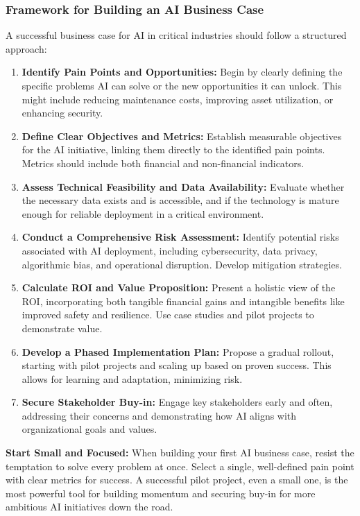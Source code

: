 \subsubsection{Framework for Building an AI Business Case}
A successful business case for AI in critical industries should follow a structured approach:
\begin{enumerate}
    \item \textbf{Identify Pain Points and Opportunities:} Begin by clearly defining the specific problems AI can solve or the new opportunities it can unlock. This might include reducing maintenance costs, improving asset utilization, or enhancing security.
    \item \textbf{Define Clear Objectives and Metrics:} Establish measurable objectives for the AI initiative, linking them directly to the identified pain points. Metrics should include both financial and non-financial indicators.
    \item \textbf{Assess Technical Feasibility and Data Availability:} Evaluate whether the necessary data exists and is accessible, and if the technology is mature enough for reliable deployment in a critical environment.
    \item \textbf{Conduct a Comprehensive Risk Assessment:} Identify potential risks associated with AI deployment, including cybersecurity, data privacy, algorithmic bias, and operational disruption. Develop mitigation strategies.
    \item \textbf{Calculate ROI and Value Proposition:} Present a holistic view of the ROI, incorporating both tangible financial gains and intangible benefits like improved safety and resilience. Use case studies and pilot projects to demonstrate value.
    \item \textbf{Develop a Phased Implementation Plan:} Propose a gradual rollout, starting with pilot projects and scaling up based on proven success. This allows for learning and adaptation, minimizing risk.
    \item \textbf{Secure Stakeholder Buy-in:} Engage key stakeholders early and often, addressing their concerns and demonstrating how AI aligns with organizational goals and values.
\end{enumerate}

\begin{tip}
\textbf{Start Small and Focused:} When building your first AI business case, resist the temptation to solve every problem at once. Select a single, well-defined pain point with clear metrics for success. A successful pilot project, even a small one, is the most powerful tool for building momentum and securing buy-in for more ambitious AI initiatives down the road.
\end{tip}

